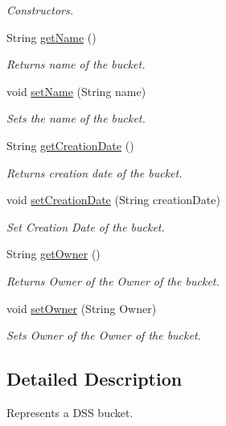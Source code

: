 \begin{DoxyCompactItemize}
\begin{DoxyCompactList}\small\item\em Constructors. \end{DoxyCompactList}\item 
String \hyperlink{classorg_1_1jcs_1_1dss_1_1main_1_1Bucket_a6208f7c04595b3b243974e1fd704c56d}{get\+Name} ()
\begin{DoxyCompactList}\small\item\em Returns name of the bucket. \end{DoxyCompactList}\item 
void \hyperlink{classorg_1_1jcs_1_1dss_1_1main_1_1Bucket_a737a416e858a81ef9fecd3d83830881c}{set\+Name} (String name)
\begin{DoxyCompactList}\small\item\em Sets the name of the bucket. \end{DoxyCompactList}\item 
String \hyperlink{classorg_1_1jcs_1_1dss_1_1main_1_1Bucket_ad822a73b4f3d54d45df6c886e17b6972}{get\+Creation\+Date} ()
\begin{DoxyCompactList}\small\item\em Returns creation date of the bucket. \end{DoxyCompactList}\item 
void \hyperlink{classorg_1_1jcs_1_1dss_1_1main_1_1Bucket_abcaf6bd03c9e347172cd4c9ce85bca4b}{set\+Creation\+Date} (String creation\+Date)
\begin{DoxyCompactList}\small\item\em Set Creation Date of the bucket. \end{DoxyCompactList}\item 
String \hyperlink{classorg_1_1jcs_1_1dss_1_1main_1_1Bucket_a1c06de55c153f8ac133752a7ff922d7e}{get\+Owner} ()
\begin{DoxyCompactList}\small\item\em Returns Owner of the Owner of the bucket. \end{DoxyCompactList}\item 
void \hyperlink{classorg_1_1jcs_1_1dss_1_1main_1_1Bucket_ab4ad846751084ff2d2356c483c5e5df4}{set\+Owner} (String Owner)
\begin{DoxyCompactList}\small\item\em Sets Owner of the Owner of the bucket. \end{DoxyCompactList}\end{DoxyCompactItemize}


\subsection{Detailed Description}
Represents a D\+SS bucket. 

